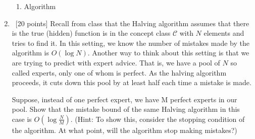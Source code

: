 \begin{enumerate}
\begin{enumerate}
		\item Algorithm
	
	
	
	
	
	
	
	\end{enumerate}	    
    
     	
    
    
    

    \item~[20 points] Recall from class that the Halving algorithm assumes that there is the true (hidden) function is in the concept class $\mathcal{C}$ with $N$ elements and tries to find it. In this setting, we know the number of mistakes made by the algorithm is $O(\log N)$.
        Another way to think about this setting is that we are trying to predict with expert advice. That is, we have a pool of $N$ so called experts, only one of whom is perfect. As the halving algorithm proceeds, it cuts down this pool by at least half each time a mistake is made.

        Suppose, instead of one perfect expert, we have M perfect experts in our pool. Show that the mistake bound of the same Halving algorithm in this case is $O(\log\frac{N}{M})$.
        (Hint: To show this, consider the stopping condition of the algorithm. At what point, will the algorithm stop making mistakes?)
\end{enumerate}


